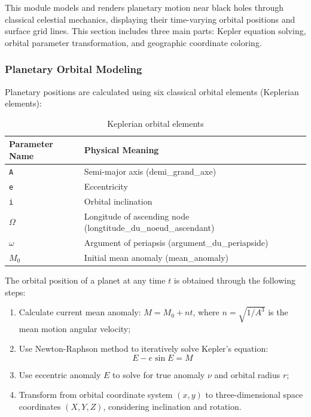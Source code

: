 \documentclass[11pt,a4paper]{article}
\begin{document}
This module models and renders planetary motion near black holes through classical celestial mechanics, displaying their time-varying orbital positions and surface grid lines. This section includes three main parts: Kepler equation solving, orbital parameter transformation, and geographic coordinate coloring.

\subsubsection{Planetary Orbital Modeling}

Planetary positions are calculated using six classical orbital elements (Keplerian elements):

\begin{table}[H]
\centering
\begin{tabular}{@{}ll@{}}
\toprule
Parameter Name & Physical Meaning \\
\midrule
\texttt{A} & Semi-major axis (demi\_grand\_axe) \\
\texttt{e} & Eccentricity \\
\texttt{i} & Orbital inclination \\
$\Omega$ & Longitude of ascending node (longtitude\_du\_noeud\_ascendant) \\
$\omega$ & Argument of periapsis (argument\_du\_periapside) \\
$M_0$ & Initial mean anomaly (mean\_anomaly) \\
\bottomrule
\end{tabular}
\caption{Keplerian orbital elements}
\end{table}

The orbital position of a planet at any time $t$ is obtained through the following steps:

\begin{enumerate}
    \item Calculate current mean anomaly: $M = M_0 + nt$, where $n = \sqrt{1/A^3}$ is the mean motion angular velocity;
    \item Use Newton-Raphson method to iteratively solve Kepler's equation:
    \begin{equation}
    E - e \sin E = M
    \end{equation}
    \item Use eccentric anomaly $E$ to solve for true anomaly $\nu$ and orbital radius $r$;
    \item Transform from orbital coordinate system $(x, y)$ to three-dimensional space coordinates $(X, Y, Z)$, considering inclination and rotation.
\end{enumerate}
\end{document}
